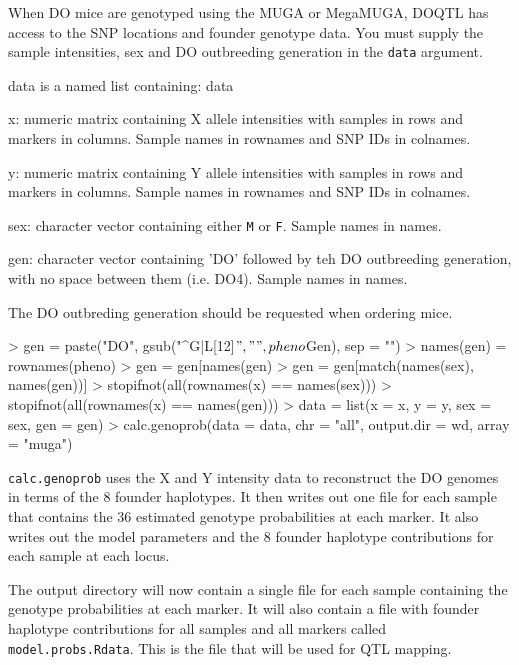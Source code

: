 \documentclass{article}
\begin{document}
When DO mice are genotyped using the MUGA or MegaMUGA, DOQTL has access to the SNP locations and 
founder genotype data. You must supply the sample intensities, sex and DO outbreeding generation
in the \texttt{data} argument. 

data is a named list containing:
data\begin{description}
  \item{x: numeric matrix containing X allele intensities with samples in rows and markers in columns. Sample names in rownames and SNP IDs in colnames.}
  \item{y: numeric matrix containing Y allele intensities with samples in rows and markers in columns. Sample names in rownames and SNP IDs in colnames.}
  \item{sex: character vector containing either \texttt{M} or \texttt{F}. Sample names in names.}
  \item{gen: character vector containing 'DO' followed by teh DO outbreeding generation, with no space between them (i.e. DO4). Sample names in names.}
\end{description}

The DO outbreding generation should be requested when ordering mice.

\begin{Schunk}
\begin{Sinput}
> gen = paste("DO", gsub("^G|L[12]$", "", pheno$Gen), sep = "")
> names(gen) = rownames(pheno)
> gen = gen[names(gen) %
> gen = gen[match(names(sex), names(gen))]
> stopifnot(all(rownames(x) == names(sex)))
> stopifnot(all(rownames(x) == names(gen)))
> data = list(x = x, y = y, sex = sex, gen = gen)
> calc.genoprob(data = data, chr = "all", output.dir = wd, array = "muga")
\end{Sinput}
\end{Schunk}

\texttt{calc.genoprob} uses the X and Y intensity data to reconstruct the DO genomes in terms 
of the 8 founder haplotypes. It then writes out one file for each sample that contains the 36
estimated genotype probabilities at each marker. It also writes out the model parameters and 
the 8 founder haplotype contributions for each sample at each locus.

\vspace{5 mm}

The output directory will now contain a single file for each sample containing the genotype probabilities at each marker. It will also contain a file with founder haplotype contributions for all samples and all markers called \texttt{model.probs.Rdata}. This is the file that will be used for QTL mapping.
\end{document}
